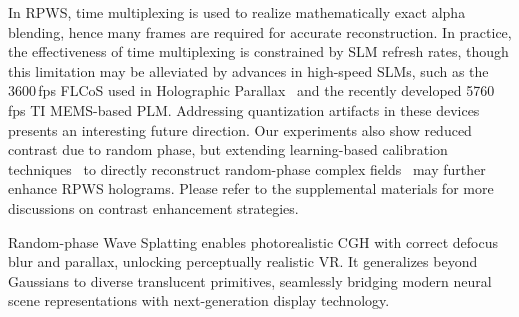 In RPWS, time multiplexing is used to realize mathematically exact alpha blending, hence many frames are required for accurate reconstruction. In practice, the effectiveness of time multiplexing is constrained by SLM refresh rates, though this limitation may be alleviated by advances in high-speed SLMs, such as the 3600\,fps FLCoS used in Holographic Parallax~\cite{kim2024holographic} and the recently developed 5760\,fps TI MEMS-based PLM. Addressing quantization artifacts in these devices presents an interesting future direction. Our experiments also show reduced contrast due to random phase, but extending learning-based calibration techniques~\cite{peng2020neural, choi2022time} to directly reconstruct random-phase complex fields~\cite{jang2024waveguide} may further enhance RPWS holograms. Please refer to the supplemental materials for more discussions on contrast enhancement strategies.


 Random-phase Wave Splatting enables photorealistic CGH with correct defocus blur and parallax, unlocking perceptually realistic VR. It generalizes beyond Gaussians to diverse translucent primitives, seamlessly bridging modern neural scene representations with next-generation display technology.
